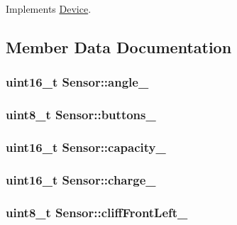 Implements \hyperlink{class_device_aab20e3f9dc696c6a1153776d526dcc0b}{Device}.



\subsection{Member Data Documentation}
\subsubsection[{\texorpdfstring{angle\+\_\+}{angle_}}]{\setlength{\rightskip}{0pt plus 5cm}uint16\+\_\+t Sensor\+::angle\+\_\+}\hypertarget{class_sensor_ab6b2271ec67379c1adb9cc8d81f38db9}{}\label{class_sensor_ab6b2271ec67379c1adb9cc8d81f38db9}
\subsubsection[{\texorpdfstring{buttons\+\_\+}{buttons_}}]{\setlength{\rightskip}{0pt plus 5cm}uint8\+\_\+t Sensor\+::buttons\+\_\+}\hypertarget{class_sensor_a4f50f4893bd2600973bb20b2f56fd184}{}\label{class_sensor_a4f50f4893bd2600973bb20b2f56fd184}
\subsubsection[{\texorpdfstring{capacity\+\_\+}{capacity_}}]{\setlength{\rightskip}{0pt plus 5cm}uint16\+\_\+t Sensor\+::capacity\+\_\+}\hypertarget{class_sensor_a7facd4c626717aa8dceebcd763df339f}{}\label{class_sensor_a7facd4c626717aa8dceebcd763df339f}
\subsubsection[{\texorpdfstring{charge\+\_\+}{charge_}}]{\setlength{\rightskip}{0pt plus 5cm}uint16\+\_\+t Sensor\+::charge\+\_\+}\hypertarget{class_sensor_a2ab14861ceb9304f9b6dc7a8eab5e156}{}\label{class_sensor_a2ab14861ceb9304f9b6dc7a8eab5e156}
\subsubsection[{\texorpdfstring{cliff\+Front\+Left\+\_\+}{cliffFrontLeft_}}]{\setlength{\rightskip}{0pt plus 5cm}uint8\+\_\+t Sensor\+::cliff\+Front\+Left\+\_\+}\hypertarget{class_sensor_ab1a85642aa3468803b02d8ebfa6e1c4d}{}\label{class_sensor_ab1a85642aa3468803b02d8ebfa6e1c4d}
